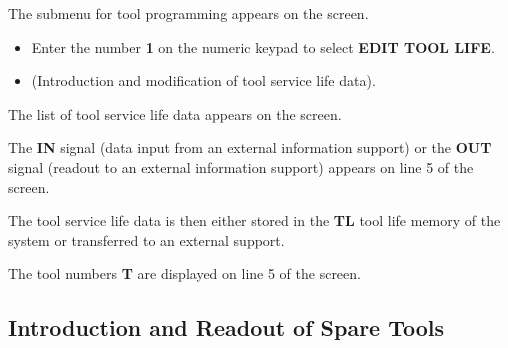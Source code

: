 The submenu for tool programming appears on the screen.

\begin{itemize}
    \item Enter the number \textbf{1} on the numeric keypad to select \textbf{EDIT TOOL LIFE}.
    \item (Introduction and modification of tool service life data).
\end{itemize}

The list of tool service life data appears on the screen.

\begin{itemize}
\end{itemize}

\vspace{.5cm}

\begin{itemize}
\end{itemize}

The \textbf{IN} signal (data input from an external information support) or the \textbf{OUT} signal (readout to an external information support) appears on line 5 of the screen.

The tool service life data is then either stored in the \textbf{TL} tool life memory of the system or transferred to an external support.

The tool numbers \textbf{T} are displayed on line 5 of the screen.

\subsection{Introduction and Readout of Spare Tools}

\begin{itemize}
\end{itemize}

\vspace{.5cm}

\begin{itemize}
\end{itemize}

\vspace{.5cm}

\begin{itemize}
\end{itemize}

